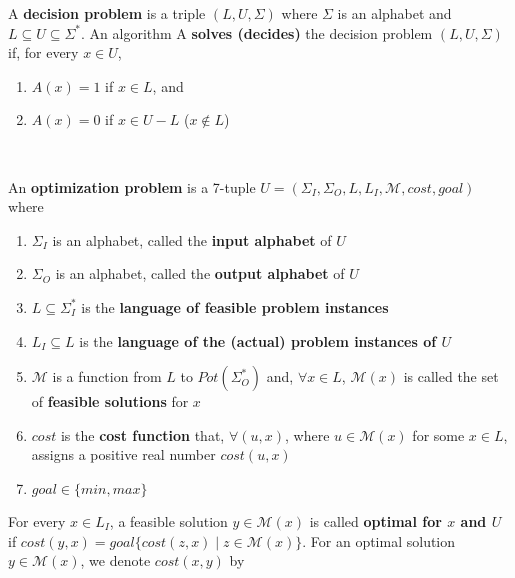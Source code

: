 \begin{tabu}
 {A {\bf decision problem} is a triple $(L, U, \Sigma)$ where $\Sigma$ is an
   alphabet and $L \subseteq U \subseteq \Sigma^*$. An algorithm A {\bf solves
     (decides)} the decision problem $(L, U, \Sigma)$ if, for every $x \in U$,
  \begin{enumerate} \itemsep1pt \parskip0pt  \vspace{-\medskipamount}
  \item $A(x) = 1$ if $x \in L$, and
  \item $A(x) = 0$ if $x \in U - L$ ($x \notin L$)
  \vspace{-\medskipamount} \end{enumerate}
  } \\ \hline
 {An {\bf optimization problem} is a 7-tuple $U = (\Sigma_I, \Sigma_O, L, L_I,
   \mathcal{M}, cost, goal)$ where
   \begin{enumerate} \itemsep1pt \parskip0pt  \vspace{-\medskipamount}
   \item $\Sigma_I$ is an alphabet, called the {\bf input alphabet} of $U$
   \item $\Sigma_O$ is an alphabet, called the {\bf output alphabet} of $U$
   \item $L \subseteq \Sigma_I^*$ is the {\bf language of feasible problem
     instances}
   \item $L_I \subseteq L$ is the {\bf language of the (actual) problem
     instances of $U$}
   \item $\mathcal{M}$ is a function from $L$ to $Pot(\Sigma_O^*)$ and, $\forall
     x \in L$, $\mathcal{M}(x)$ is called the set of {\bf feasible solutions}
     for $x$
   \item $cost$ is the {\bf cost function} that, $\forall (u, x)$, where
     $u \in \mathcal{M}(x)$ for some $x \in L$, assigns a positive real number
     $cost(u, x)$
   \item $goal \in \{min, max\}$
   \vspace{-\medskipamount} \end{enumerate}
   For every $x \in L_I$, a feasible solution $y \in \mathcal{M}(x)$ is called
   {\bf optimal for $x$ and $U$} if $cost(y, x) = goal\{cost(z,x) \mid z \in
   \mathcal{M}(x)\}$. \newline
   For an optimal solution $y \in \mathcal{M}(x)$, we denote $cost(x,y)$ by
}
\end{tabu}
